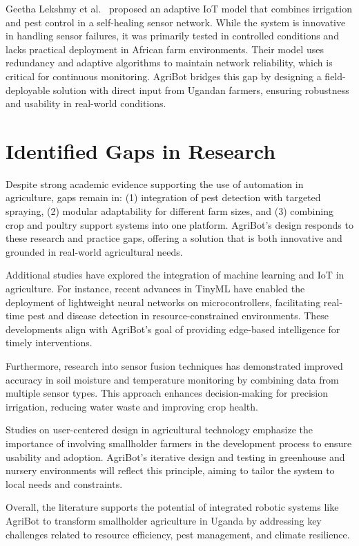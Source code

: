 \documentclass[12pt,a4paper]{report}
\begin{document}
Geetha Lekshmy et al.~\cite{geetha2022adaptive} proposed an adaptive IoT model that combines irrigation and pest control in a self-healing sensor network. While the system is innovative in handling sensor failures, it was primarily tested in controlled conditions and lacks practical deployment in African farm environments.
Their model uses redundancy and adaptive algorithms to maintain network reliability, which is critical for continuous monitoring. AgriBot bridges this gap by designing a field-deployable solution with direct input from Ugandan farmers, ensuring robustness and usability in real-world conditions.
\section{Identified Gaps in Research}
Despite strong academic evidence supporting the use of automation in agriculture, gaps remain in: (1) integration of pest detection with targeted spraying, (2) modular adaptability for different farm sizes, and (3) combining crop and poultry support systems into one platform. AgriBot’s design responds to these research and practice gaps, offering a solution that is both innovative and grounded in real-world agricultural needs.

Additional studies have explored the integration of machine learning and IoT in agriculture. For instance, recent advances in TinyML have enabled the deployment of lightweight neural networks on microcontrollers, facilitating real-time pest and disease detection in resource-constrained environments. These developments align with AgriBot’s goal of providing edge-based intelligence for timely interventions.

Furthermore, research into sensor fusion techniques has demonstrated improved accuracy in soil moisture and temperature monitoring by combining data from multiple sensor types. This approach enhances decision-making for precision irrigation, reducing water waste and improving crop health.

Studies on user-centered design in agricultural technology emphasize the importance of involving smallholder farmers in the development process to ensure usability and adoption. AgriBot’s iterative design and testing in greenhouse and nursery environments will reflect this principle, aiming to tailor the system to local needs and constraints.

Overall, the literature supports the potential of integrated robotic systems like AgriBot to transform smallholder agriculture in Uganda by addressing key challenges related to resource efficiency, pest management, and climate resilience.
\end{document}
